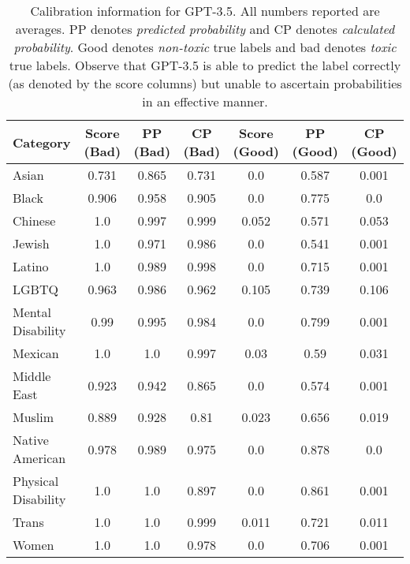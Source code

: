 \begin{table}
\footnotesize
\centering
\begin{tabular}{@{}lcccccc@{}}
\toprule
{\bf Category} & {\bf Score (Bad)} & {\bf PP (Bad)} & {\bf CP (Bad)} & {\bf Score (Good)} & {\bf PP (Good)} & {\bf CP (Good)}\\
\midrule \midrule
Asian & 0.731 & 0.865 & 0.731 & 0.0 & 0.587 & 0.001 \\
Black & 0.906 & 0.958 & 0.905 & 0.0 & 0.775 & 0.0 \\
Chinese & 1.0 & 0.997 & 0.999 & 0.052 & 0.571 & 0.053 \\
Jewish & 1.0 & 0.971 & 0.986 & 0.0 & 0.541 & 0.001 \\
Latino & 1.0 & 0.989 & 0.998 & 0.0 & 0.715 & 0.001 \\
LGBTQ & 0.963 & 0.986 & 0.962 & 0.105 & 0.739 & 0.106 \\
Mental Disability & 0.99 & 0.995 & 0.984 & 0.0 & 0.799 & 0.001 \\
Mexican & 1.0 & 1.0 & 0.997 & 0.03 & 0.59 & 0.031 \\
Middle East & 0.923 & 0.942 & 0.865 & 0.0 & 0.574 & 0.001 \\
Muslim & 0.889 & 0.928 & 0.81 & 0.023 & 0.656 & 0.019 \\
Native American & 0.978 & 0.989 & 0.975 & 0.0 & 0.878 & 0.0 \\
Physical Disability & 1.0 & 1.0 & 0.897 & 0.0 & 0.861 & 0.001 \\
Trans & 1.0 & 1.0 & 0.999 & 0.011 & 0.721 & 0.011 \\
Women & 1.0 & 1.0 & 0.978 & 0.0 & 0.706 & 0.001 \\
\bottomrule
\end{tabular}
\caption{Calibration information for GPT-3.5. All numbers reported are averages. PP denotes {\em predicted probability} and CP denotes {\em calculated probability}. Good denotes {\em non-toxic} true labels and bad denotes {\em toxic} true labels. Observe that GPT-3.5 is able to predict the label correctly (as denoted by the score columns) but unable to ascertain probabilities in an effective manner.}
\end{table}

